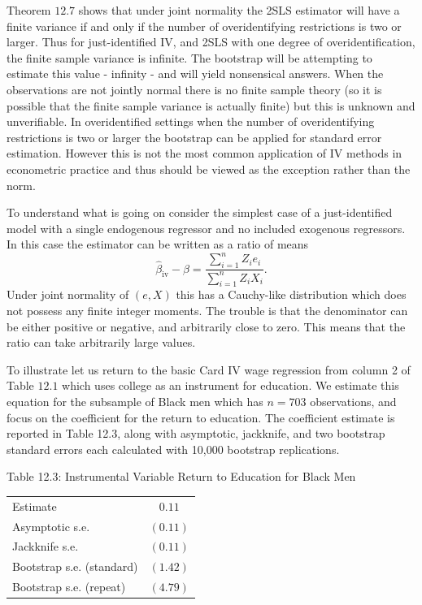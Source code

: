 \documentclass[10pt]{article}
\begin{document}
Theorem $12.7$ shows that under joint normality the 2SLS estimator will have a finite variance if and only if the number of overidentifying restrictions is two or larger. Thus for just-identified IV, and 2SLS with one degree of overidentification, the finite sample variance is infinite. The bootstrap will be attempting to estimate this value - infinity - and will yield nonsensical answers. When the observations are not jointly normal there is no finite sample theory (so it is possible that the finite sample variance is actually finite) but this is unknown and unverifiable. In overidentified settings when the number of overidentifying restrictions is two or larger the bootstrap can be applied for standard error estimation. However this is not the most common application of IV methods in econometric practice and thus should be viewed as the exception rather than the norm.

To understand what is going on consider the simplest case of a just-identified model with a single endogenous regressor and no included exogenous regressors. In this case the estimator can be written as a ratio of means
$$
\widehat{\beta}_{\mathrm{iv}}-\beta=\frac{\sum_{i=1}^{n} Z_{i} e_{i}}{\sum_{i=1}^{n} Z_{i} X_{i}} .
$$
Under joint normality of $(e, X)$ this has a Cauchy-like distribution which does not possess any finite integer moments. The trouble is that the denominator can be either positive or negative, and arbitrarily close to zero. This means that the ratio can take arbitrarily large values.

To illustrate let us return to the basic Card IV wage regression from column 2 of Table $12.1$ which uses college as an instrument for education. We estimate this equation for the subsample of Black men which has $n=703$ observations, and focus on the coefficient for the return to education. The coefficient estimate is reported in Table 12.3, along with asymptotic, jackknife, and two bootstrap standard errors each calculated with 10,000 bootstrap replications.

Table 12.3: Instrumental Variable Return to Education for Black Men

\begin{tabular}{lc}
\hline\hline
Estimate & $0.11$ \\
Asymptotic s.e. & $(0.11)$ \\
Jackknife s.e. & $(0.11)$ \\
Bootstrap s.e. (standard) & $(1.42)$ \\
Bootstrap s.e. (repeat) & $(4.79)$ \\
\hline
\end{tabular}
\end{document}
